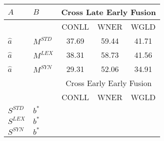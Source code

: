 \begin{table}[]
\centering
\begin{tabular}{@{}llccc@{}}
\toprule

$A$       & $B$ &           \multicolumn{3}{c}{Cross Late Early Fusion}         \\ \midrule
         &                     & CONLL                                                                    & WNER        & WGLD       \\ \cmidrule{3-5}
$\hat{a}$ & $M^{STD}$            & 37.69                                                                    & 59.44       & 41.71      \\
$\hat{a}$ & $M^{LEX}$            & 38.31                                                                    & 58.73       & 41.56      \\
$\hat{a}$ & $M^{SYN}$            & 29.31                                                                    & 52.06       & 34.91      \\ \midrule
           &    &                  \multicolumn{3}{c}{Cross Early Early Fusion}     \\ \midrule
          &                      & CONLL                                                                    & WNER        & WGLD       \\ \cmidrule{3-5}
$S^{STD}$ & $b^*$                &                                                                          &             &            \\
$S^{LEX}$ & $b^*$                &                                                                          &             &            \\
$S^{SYN}$ & $b^*$                &                                                                          &             &            \\ \midrule


\end{tabular}
\end{table}
